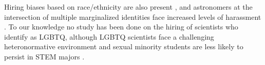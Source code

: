 \documentclass[modern]{aastex62}
\begin{document}
Hiring biases based on race/ethnicity are also present \citep{ber04,gib16}, and astronomers at the intersection of multiple marginalized identities face increased levels of harassment \citep{cla17}. To our knowledge no study has been done on the hiring of scientists who identify as LGBTQ, although LGBTQ scientists face a challenging heteronormative environment \citep{cec11,ath16,yod16} and sexual minority students are less likely to persist in STEM majors \citep{hug18}.



\end{document}
